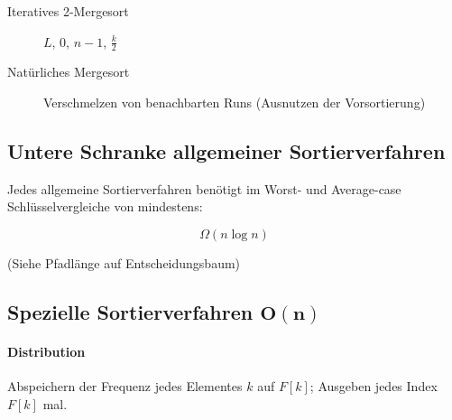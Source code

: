 \begin{description}
  \item [Iteratives 2-Mergesort]

        \begin{algorithm}[H]



          \Merge $L$, $0$, $n - 1$, $\frac{k}{2}$
        \end{algorithm}

  \item [Natürliches Mergesort]
        Verschmelzen von benachbarten Runs (Ausnutzen der Vorsortierung)

\end{description}

\subsection{Untere Schranke allgemeiner Sortierverfahren}

\begin{mzImportant}
  Jedes allgemeine Sortierverfahren benötigt im Worst- und Average-case Schlüsselvergleiche von mindestens:

  $$\Omega (n \log n)$$
\end{mzImportant}

(Siehe Pfadlänge auf Entscheidungsbaum)

\subsection{Spezielle Sortierverfahren $\mathbf{O(n)}$}

\paragraph{Distribution}

Abspeichern der Frequenz jedes Elementes $k$ auf $F[k]$; Ausgeben jedes Index $F[k]$ mal.

